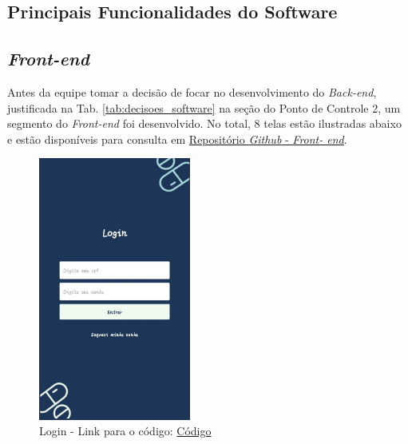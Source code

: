 \begin{apendicesenv}
\chapter{Principais Funcionalidades do Software}\label{principais_funcionalidades_software}
\section{\textit{Front-end}}

Antes da equipe tomar a decisão de focar no desenvolvimento do \textit{Back-end}, justificada na Tab. \ref{tab:decisoes_software} na seção do Ponto de Controle 2, um segmento do \textit{Front-end} foi desenvolvido. No total, 8 telas estão ilustradas abaixo e estão disponíveis para consulta em \href{https://github.com/PillWatcher/pillwatcher-dpf-service/tree/dev/components}{Repositório \textit{Github} - \textit{Front- end}}.




\begin{figure}[H]
    \centering
    \includegraphics[width=5cm]{figuras/software/telas_frontend/front_login.jpg}
    \caption{Login - Link para o código: \href{https://github.com/PillWatcher/pillwatcher-dpf-service/blob/dev/components/login.js}{Código}}
    \label{fig:login}
\end{figure}


\end{apendicesenv}
